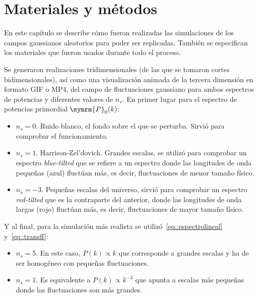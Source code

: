 \chapter{Materiales y métodos}
En este capítulo se describe cómo fueron realizadas las simulaciones de los campos gaussianos aleatorios para poder ser replicadas. También se especifican los materiales que fueron usados durante todo el proceso.

Se generaron realizaciones tridimensionales (de las que se tomaron cortes bidimensionales), así como una visualización animada de la tercera dimensión en formato GIF o MP4, del campo de fluctuaciones gaussiano para ambos espectros de potencias y diferentes valores de \(n_s\). En primer lugar para el espectro de potencias primordial \(\symrm{P}_0(k)\):
\begin{itemize}
    \item \(n_s=0\). Ruido blanco, el fondo sobre el que se perturba. Sirvió para comprobar el funcionamiento.
    \item \(n_s=1\). Harrison-Zel'dovich. Grandes escalas, se utilizó para comprobar un espectro \textit{blue-tilted} que se refiere a un espectro donde las longitudes de onda pequeñas (azul) fluctúan más, es decir, fluctuaciones de menor tamaño físico.
    \item \(n_s=-3\). Pequeñas escalas del universo, sirvió para comprobar un espectro \textit{red-tilted} que es la contraparte del anterior, donde las longitudes de onda largas (rojo) fluctúan más, es decir, fluctuaciones de mayor tamaño físico.
\end{itemize}
Y al final, para la simulación más realista se utilizó~\eqref{eq::espectrolineal} y~\eqref{eq::transff}:
\begin{itemize}
    \item \(n_s=5\). En este caso, \(P(k)\propto k\) que corresponde a grandes escalas y ha de ser homogéneo con pequeñas fluctuaciones.
    \item \(n_s=1\). Es equivalente a \(P(k)\propto k^{-3}\) que apunta a escalas más pequeñas donde las fluctuaciones son más grandes.
\end{itemize}

